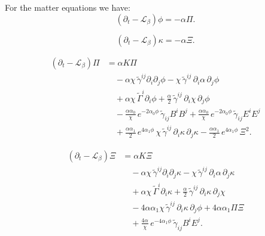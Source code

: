 For the matter equations we have:
\begin{equation}
(\partial_t - \mathcal{L}_{\beta}) \phi
= - \alpha \Pi .
\end{equation}

\begin{equation}
(\partial_t - \mathcal{L}_{\beta}) \kappa
= - \alpha \Xi .
\end{equation}

\begin{equation}
\begin{aligned}
(\partial_t - \mathcal{L}_{\beta}) \Pi
&= \alpha K \Pi
\\[3pt]
&\quad
- \alpha \chi\, \tilde{\gamma}^{ij} \partial_i \partial_j \phi
- \chi\, \tilde{\gamma}^{ij}\, \partial_i \alpha\, \partial_j \phi
\\[3pt]
&\quad
+ \alpha \chi\, \tilde{\Gamma}^i \partial_i \phi
+ \frac{\alpha}{2}\, \tilde{\gamma}^{ij}\, \partial_i \chi\, \partial_j \phi
\\[6pt]
&\quad
- \frac{\alpha \alpha_0}{\chi}\,
  e^{-2\alpha_0 \phi}\,
  \tilde{\gamma}_{ij} B^i B^j
+ \frac{\alpha \alpha_0}{\chi}\,
  e^{-2\alpha_0 \phi}\,
  \tilde{\gamma}_{ij} E^i E^j
\\[6pt]
&\quad
+ \frac{\alpha \alpha_1}{2}\,
  e^{4\alpha_1 \phi}\,
  \chi\, \tilde{\gamma}^{ij}\,
  \partial_i \kappa\, \partial_j \kappa
- \frac{\alpha \alpha_1}{2}\,
  e^{4\alpha_1 \phi}\,
  \Xi^2 .
\end{aligned}
\end{equation}


\begin{equation}
\begin{aligned}
(\partial_t - \mathcal{L}_{\beta}) \Xi
&= \alpha K \Xi
\\[3pt]
&\quad
- \alpha \chi\, \tilde{\gamma}^{ij} \partial_i \partial_j \kappa
- \chi\, \tilde{\gamma}^{ij}\, \partial_i \alpha\, \partial_j \kappa
\\[3pt]
&\quad
+ \alpha \chi\, \tilde{\Gamma}^i \partial_i \kappa
+ \frac{\alpha}{2}\, \tilde{\gamma}^{ij}\, \partial_i \kappa\, \partial_j \chi
\\[6pt]
&\quad
- 4 \alpha \alpha_1 \chi\, \tilde{\gamma}^{ij}\,
  \partial_i \kappa\, \partial_j \phi
+ 4 \alpha \alpha_1 \Pi \Xi
\\[6pt]
&\quad
+ \frac{4\alpha}{\chi}\,
  e^{-4\alpha_1 \phi}\,
  \tilde{\gamma}_{ij} B^i E^j .
\end{aligned}
\end{equation}


